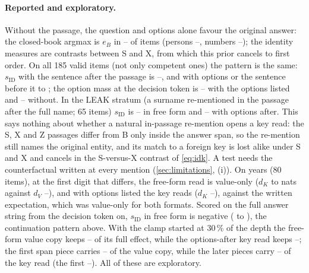 \paragraph{Reported and exploratory.} Without the passage, the question and options alone favour the original answer: the closed-book argmax is $e_B$ in \JaPriorOptMin{}--\JaPriorOptMax{} of items (persons \JaPriorOptPersonMin{}--\JaPriorOptPersonMax{}, numbers \JaPriorOptNumberMin{}--\JaPriorOptNumberMax{}); the identity measures are contrasts between S and X, from which this prior cancels to first order. On all 185 valid items (not only competent ones) the pattern is the same: $s_{\mathrm{ID}}$ with the sentence after the passage is \JaSidAllMenaMin{}--\JaSidAllMenaMax{}, and with options or the sentence before it \JaSidAllBeforeMin{} to \JaSidAllBeforeMax{}; the option mass at the decision token is \JaMassAllListMin{}--\JaMassAllListMax{} with the options listed and \JaMassAllNoListMin{}--\JaMassAllNoListMax{} without. In the LEAK stratum (a surname re-mentioned in the passage after the full name; 65 items) $s_{\mathrm{ID}}$ is \JaLeakSidNomMin{}--\JaLeakSidNomMax{} in free form and \JaLeakSidOptaMin{}--\JaLeakSidOptaMax{} with options after. This says nothing about whether a natural in-passage re-mention opens a key read: the S, X and Z passages differ from B only inside the answer span, so the re-mention still names the original entity, and its match to a foreign key is lost alike under S and X and cancels in the S-versus-X contrast of \cref{eq:idk}. A test needs the counterfactual written at every mention (\cref{sec:limitations}, (i)). On years (80 items), at the first digit that differs, the free-form read is value-only ($d_K$ \JaEfourDKNomMin{} to \JaEfourDKNomMax{} nats against $d_V$ \JaEfourDVNomMin{}--\JaEfourDVNomMax{}), and with options listed the key reads ($d_K$ \JaEfourDKOptaMin{}--\JaEfourDKOptaMax{}), against the written expectation, which was value-only for both formats. Scored on the full answer string from the decision token on, $s_{\mathrm{ID}}$ in free form is negative (\JaEsixSidNomMin{} to \JaEsixSidNomMax{}), the continuation pattern above. With the clamp started at 30\,\% of the depth the free-form value copy keeps \JaEoneOnNomMin{}--\JaEoneOnNomMax{} of its full effect, while the options-after key read keeps \JaEoneOnOptaMin{}--\JaEoneOnOptaMax{}; the first span piece carries \JaEoneFirstNomMin{}--\JaEoneFirstNomMax{} of the value copy, while the later pieces carry \JaEoneRestOptaMin{}--\JaEoneRestOptaMax{} of the key read (the first \JaEoneFirstOptaMin{}--\JaEoneFirstOptaMax{}). All of these are exploratory. %
